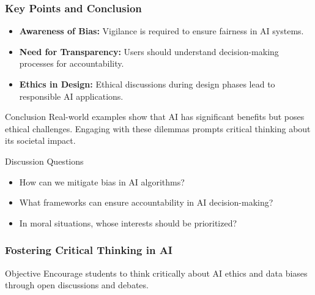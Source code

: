 \documentclass[aspectratio=169]{beamer}
\begin{document}
\begin{frame}[fragile]
    \frametitle{Key Points and Conclusion}
    \begin{itemize}
        \item \textbf{Awareness of Bias:} 
        Vigilance is required to ensure fairness in AI systems.
        
        \item \textbf{Need for Transparency:} 
        Users should understand decision-making processes for accountability.
        
        \item \textbf{Ethics in Design:} 
        Ethical discussions during design phases lead to responsible AI applications.
    \end{itemize}

    \begin{block}{Conclusion}
        Real-world examples show that AI has significant benefits but poses ethical challenges. 
        Engaging with these dilemmas prompts critical thinking about its societal impact.
    \end{block}

    \begin{block}{Discussion Questions}
        \begin{itemize}
            \item How can we mitigate bias in AI algorithms?
            \item What frameworks can ensure accountability in AI decision-making?
            \item In moral situations, whose interests should be prioritized?
        \end{itemize}
    \end{block}
\end{frame}

\begin{frame}[fragile]
    \frametitle{Fostering Critical Thinking in AI}
    \begin{block}{Objective}
        Encourage students to think critically about AI ethics and data biases through open discussions and debates.
    \end{block}
\end{frame}
\end{document}
